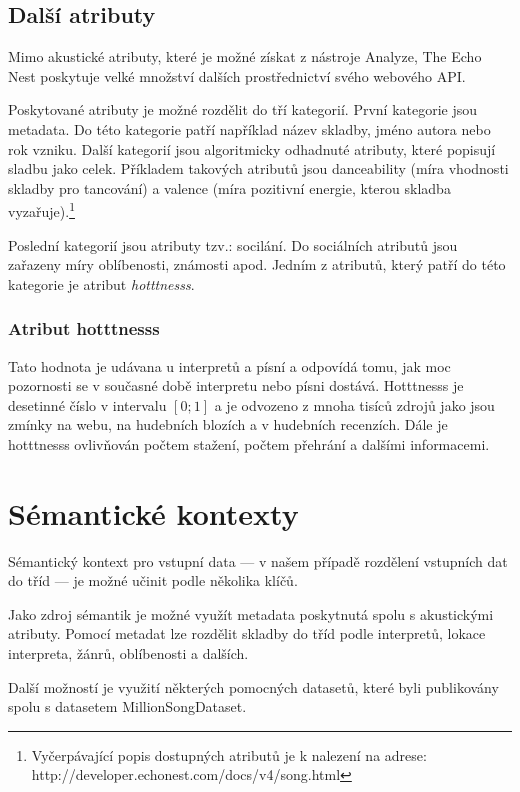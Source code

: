 \documentclass[thesis=M,czech]{FITthesis}[2012/06/26]
\begin{document}
\subsection{Další atributy}
Mimo akustické atributy, které je možné získat z nástroje Analyze, The Echo Nest poskytuje velké množství dalších prostřednictví svého webového API.

Poskytované atributy je možné rozdělit do tří kategorií. První kategorie jsou metadata. Do této kategorie patří například název skladby, jméno autora nebo rok vzniku. 
Další kategorií jsou algoritmicky odhadnuté atributy, které popisují sladbu jako celek. Příkladem takových atributů jsou danceability (míra vhodnosti skladby pro tancování) a valence (míra pozitivní energie, kterou skladba vyzařuje).\footnote{Vyčerpávající popis dostupných atributů je k nalezení na adrese: http://developer.echonest.com/docs/v4/song.html}

Poslední kategorií jsou atributy tzv.: socilání. Do sociálních atributů jsou zařazeny míry oblíbenosti, známosti apod. Jedním z atributů, který patří do této kategorie je atribut \textit{hotttnesss}.

\subsubsection{Atribut hotttnesss}\label{sec:hotttnesss}

Tato hodnota je udávana u interpretů a písní a odpovídá tomu, jak moc pozornosti se v současné době interpretu nebo písni dostává.
Hotttnesss je desetinné číslo v intervalu $[0;1]$ a je odvozeno z mnoha tisíců zdrojů jako jsou zmínky na webu, na hudebních blozích a v hudebních recenzích. Dále je hotttnesss ovlivňován počtem stažení, počtem přehrání a dalšími informacemi\cite{hotttnesss}.

\section{Sémantické kontexty}\label{sec:semcontext}
Sémantický kontext pro vstupní data --- v našem případě rozdělení vstupních dat do tříd --- je možné učinit podle několika klíčů.

Jako zdroj sémantik je možné využít metadata poskytnutá spolu s akustickými atributy. Pomocí metadat lze rozdělit skladby do tříd podle interpretů, lokace interpreta, žánrů, oblíbenosti a dalších. 

Další možností je využití některých pomocných datasetů, které byli publikovány spolu s datasetem MillionSongDataset.
\end{document}
